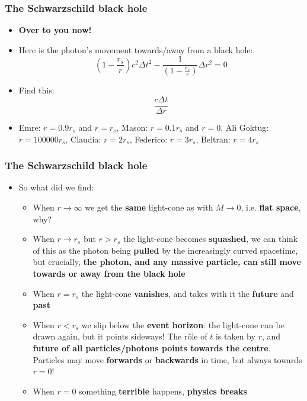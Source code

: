 \documentclass{beamer}
\begin{document}
\begin{frame}
  \frametitle{The Schwarzschild black hole}
  \begin{itemize}
    \item<1-> \textbf{Over to you now!}
    \item<2-> Here is the photon's movement towards/away from a black hole:
      \begin{equation*}
	\left( 1-\frac{r_s}{r} \right)c^2\Delta t^2-\frac{1}{\left( 1-\frac{r_s}{r} \right)}\Delta r^2=0
      \end{equation*}
    \item<3-> Find this:
      \begin{equation*}
	\frac{c\Delta t}{\Delta r}
      \end{equation*}
    \item<4-> Emre: $r=0.9r_s$ and $r=r_s$, Mason: $r=0.1r_s$ and $r=0$, Ali Goktug: $r=100000r_s$, Claudia: $r=2r_s$, Federico: $r=3r_s$, Beltran: $r=4r_s$
  \end{itemize}
\end{frame}

\begin{frame}
  \frametitle{The Schwarzschild black hole}
  \begin{itemize}
    \item<1-> So what did we find:
      \begin{itemize}
	\item<2-> When $r\to\infty$ we get the \textbf{same} light-cone as with $M\to 0$, i.e. \textbf{flat space}, why?
	\item<3-> When $r\to r_s$ but $r>r_s$ the light-cone becomes \textbf{squashed}, we can think of this as the photon being \textbf{pulled} by the increasingly curved spacetime, but crucially, \textbf{the photon, and any massive particle, can still move towards or away from the black hole}
	\item<4-> When $r=r_s$ the light-cone \textbf{vanishes}, and takes with it the \textbf{future} and \textbf{past}
	\item<5-> When $r<r_s$ we slip below the \textbf{event horizon}: the light-cone can be drawn again, but it points sideways! The r\^ole of $t$ is taken by $r$, and \textbf{future of all particles/photons points towards the centre}. Particles may move \textbf{forwards} or \textbf{backwards} in time, but always towards $r=0$!
	\item<6-> When $r=0$ something \textbf{terrible} happens, \textbf{physics breaks}
      \end{itemize}
  \end{itemize}
\end{frame}
\end{document}
